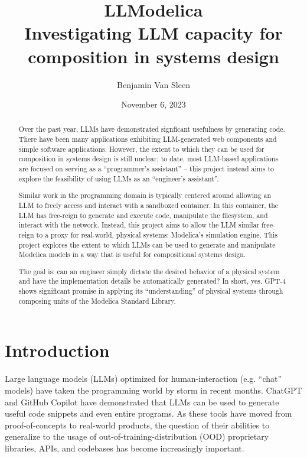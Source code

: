 \documentclass[11pt]{article}
\author{Benjamin Van Sleen}
\date{November 6, 2023}
\title{LLModelica\\\medskip
\large Investigating LLM capacity for composition in systems design}
\let\oldsection\section
\renewcommand\section{\clearpage\oldsection}
\begin{document}
\maketitle
\tableofcontents




\section{Introduction}
\label{sec:org96a5dc2}
\begin{abstract}
Over the past year, LLMs have demonstrated signficant usefulness by generating code. There have been many applications exhibiting LLM-generated web components and simple software applications. However, the extent to which they can be used for composition in systems design is still unclear; to date, most LLM-based applications are focused on serving as a ``programmer's assistant'' -- this project instead aims to explore the feasibility of using LLMs as an ``engineer's assistant''.

Similar work in the programming domain is typically centered around allowing an LLM to freely access and interact with a sandboxed container. In this container, the LLM has free-reign to generate and execute code, manipulate the filesystem, and interact with the network. Instead, this project aims to allow the LLM similar free-reign to a proxy for real-world, physical systems: Modelica's simulation engine. This project explores the extent to which LLMs can be used to generate and manipulate Modelica models in a way that is useful for compositional systems design.

The goal is: can an engineer simply dictate the desired behavior of a physical system and have the implementation details be automatically generated? In short, yes. GPT-4 shows significant promise in applying its ``understanding'' of physical systems through composing units of the Modelica Standard Library.
\end{abstract}

Large language models (LLMs) optimized for human-interaction (e.g. ``chat'' models) have taken the programming world by storm in recent months. ChatGPT and GitHub Copilot have demonstrated that LLMs can be used to generate useful code snippets and even entire programs. As these tools have moved from proof-of-concepts to real-world products, the question of their abilities to generalize to the usage of out-of-training-distribution (OOD) proprietary libraries, APIs, and codebases has become increasingly important.
\end{document}
